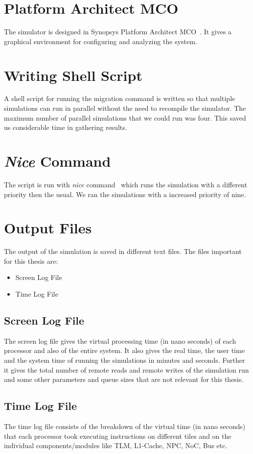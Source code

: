 \documentclass{listhesis}
\begin{document}
\section{Platform Architect MCO}
The simulator is designed in Synopsys Platform Architect MCO~\cite{synopsys}. It gives a graphical environment for configuring and analyzing the system. 
\section{Writing Shell Script}
A shell script for running the migration command is written so that multiple simulations can run in parallel without the need to recompile the simulator. The maximum number of parallel simulations that we could run was four. This saved us considerable time in gathering results. 
\section{\textit{Nice} Command}
The script is run with \textit{nice} command~\cite{nice} which runs the simulation with a different priority then the usual. We ran the simulations with a increased priority of nine.
\section{Output Files}
The output of the simulation is saved in different text files. The files important for this thesis are:
\begin{itemize}
\item Screen Log File
\item Time Log File
\end{itemize}
\subsection{Screen Log File}
The screen log file gives the virtual processing time (in nano seconds) of each processor and also of the entire system. It also gives the real time, the user time and the system time of running the simulations in minutes and seconds. Further it gives the total number of remote reads and remote writes of the simulation run and some other parameters and queue sizes that are not relevant for this thesis.\\
\subsection{Time Log File}
The time log file consists of the breakdown of the virtual time (in nano seconds) that each processor took executing instructions on different tiles and on the individual components/modules like TLM, L1-Cache, NPC, NoC, Bus etc.
\end{document}
